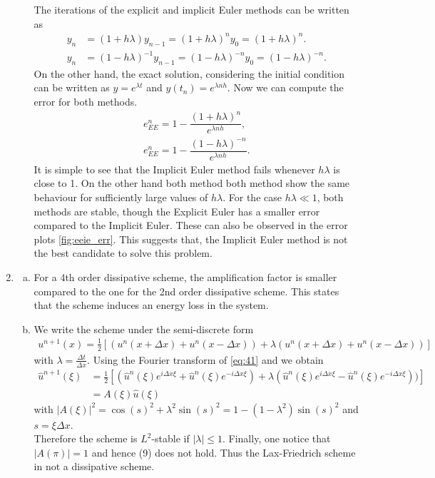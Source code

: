 \documentclass[10pt,a4paper,twoside, french]{article}
\numberwithin{equation}{section}
\numberwithin{figure}{section}
\numberwithin{table}{section}
\newcommand{\chap}[1]{\widehat{#1}}
\begin{document}
\begin{enumerate}
\begin{enumerate}[a.]
The iterations of the explicit and implicit Euler methods can be written as
\begin{align}
y_{n} &= (1+h\lambda)y_{n-1}=(1+h\lambda)^ny_0=(1+h\lambda)^n. \\
y_{n} &= (1-h\lambda)^{-1}y_{n-1}=(1-h\lambda)^{-n}y_0=(1-h\lambda)^{-n}.
\end{align}
On the other hand, the exact solution, considering the initial condition can be written as $y=e^{\lambda t}$ and $y(t_n)=e^{\lambda nh}$. Now we can compute the error for both methods.
\begin{align}
e^n_{EE} = 1-\dfrac{(1+h\lambda)^n}{e^{\lambda nh}},\\
e^n_{EE} = 1-\dfrac{(1-h\lambda)^{-n}}{e^{\lambda nh}}.
\end{align}
It is simple to see that the Implicit Euler method fails whenever $h\lambda$ is close to 1. On the other hand both method  both method show the same behaviour for sufficiently large values of $h\lambda$. For the case $h\lambda\ll 1$, both methods are stable, though the Explicit Euler has a smaller error compared to the Implicit Euler. These can also be observed in the error plots \ref{fig:eeie_err}. This suggests that, the Implicit Euler method is not the best candidate to solve this problem.

\end{enumerate}

\setcounter{section}{4}
\item  \begin{enumerate}[a.]
\item For a 4th order dissipative scheme, the amplification factor is smaller compared to the one for the 2nd order dissipative scheme. This states that the scheme induces an energy loss in the system. 
\item We write the scheme under the semi-discrete form
\begin{align}
u^{n+1}(x) = \frac{1}{2} \left[(u^n(x+\Delta x) +u^n(x-\Delta x)) + \lambda(u^n(x+\Delta x) +u^n(x-\Delta x))\right] 
\label{eq:41}
\end{align}
with $\lambda=\frac{\Delta t }{\Delta x}$. Using the Fourier transform of \ref{eq:41} and we obtain
\begin{align*}
\chap{u}^{n+1}(\xi)  & = \frac{1}{2} \left[(\chap{u}^n(\xi)e^{i\Delta x \xi} +\chap{u}^n(\xi)e^{-i\Delta x \xi}) 
+ \lambda(\chap{u}^n(\xi)e^{i\Delta x \xi} -\chap{u}^n(\xi)e^{-i\Delta x \xi}) )\right] \\
 & = A(\xi)\chap{u}(\xi)
\end{align*}
with $|A(\xi)|^2 = \cos(s)^2 +\lambda^2 \sin(s)^2 = 1-(1-\lambda^2)\sin(s)^2$ and $s=\xi \Delta x$.\\
Therefore the scheme is $L^2$-stable if $|\lambda | \leq 1$. Finally, one notice that $|A(\pi)| =1$ and hence (9) does not hold. Thus the Lax-Friedrich scheme in not a dissipative scheme. 


\end{enumerate}
\end{enumerate}
\end{document}
